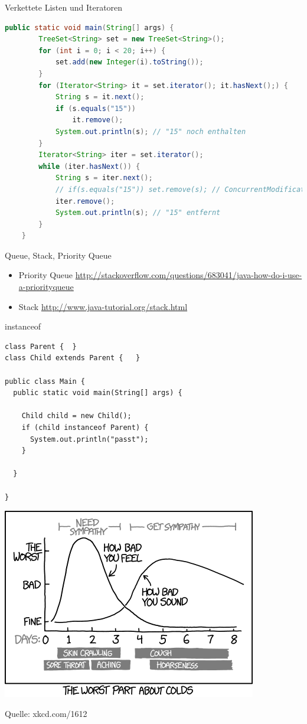 \documentclass[18pt]{beamer}
\begin{document}
\begin{frame}[fragile]{Verkettete Listen und Iteratoren}
\begin{lstlisting}[language=java]
    public static void main(String[] args) {
        TreeSet<String> set = new TreeSet<String>();
        for (int i = 0; i < 20; i++) {
            set.add(new Integer(i).toString());
        }
        for (Iterator<String> it = set.iterator(); it.hasNext();) {
            String s = it.next();
            if (s.equals("15"))
                it.remove();
            System.out.println(s); // "15" noch enthalten
        }
        Iterator<String> iter = set.iterator();
        while (iter.hasNext()) {
            String s = iter.next();
            // if(s.equals("15")) set.remove(s); // ConcurrentModificationException
            iter.remove();
            System.out.println(s); // "15" entfernt
        }
    }
\end{lstlisting}

\end{frame}


\begin{frame}{Queue, Stack, Priority Queue}
\begin{itemize}
 \item Priority Queue \url{http://stackoverflow.com/questions/683041/java-how-do-i-use-a-priorityqueue}
 \item Stack \url{http://www.java-tutorial.org/stack.html}
\end{itemize}

 
\end{frame}

\begin{frame}[fragile]{instanceof}
 \begin{lstlisting}
class Parent {  }
class Child extends Parent {   }

public class Main {
  public static void main(String[] args) {

    Child child = new Child();
    if (child instanceof Parent) {
      System.out.println("passt");
    }

  }

}
 \end{lstlisting}

\end{frame}


\begin{frame}
 \includegraphics[scale=0.7]{colds}
 
 \tiny{Quelle: xkcd.com/1612}
\end{frame}
\end{document}
